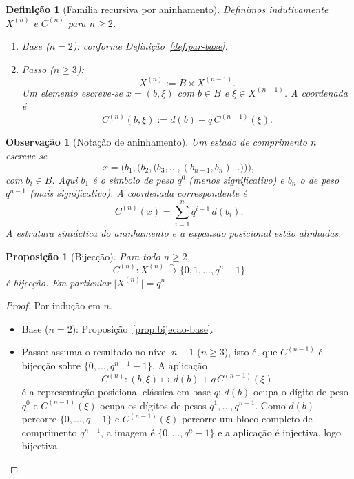 \documentclass[11pt,a4paper]{article}
\newtheorem{definicao}{Definição}
\newtheorem{proposicao}{Proposição}
\newtheorem{observacao}{Observação}
\begin{document}
\begin{definicao}[Família recursiva por aninhamento]
\label{def:familia}
Definimos indutivamente \(X^{(n)}\) e \(C^{(n)}\) para \(n\ge 2\).

\begin{enumerate}[leftmargin=1.5em]
\item Base (\(n=2\)): conforme Definição~\ref{def:par-base}.

\item Passo (\(n\ge 3\)):
\[
X^{(n)} := B\times X^{(n-1)}.
\]
Um elemento escreve-se \(x=(b,\xi)\) com \(b\in B\) e \(\xi\in X^{(n-1)}\).
A coordenada é
\[
C^{(n)}(b,\xi) := d(b) + q\, C^{(n-1)}(\xi).
\]
\end{enumerate}
\end{definicao}

\begin{observacao}[Notação de aninhamento]
\label{obs:aninhamento}
Um estado de comprimento \(n\) escreve-se
\[
x = \bigl(b_1,\bigl(b_2,\bigl(b_3,\dots,(b_{n-1},b_n)\dots\bigr)\bigr)\bigr),
\]
com \(b_i\in B\).
Aqui \(b_1\) é o símbolo de peso \(q^0\) (menos significativo) e \(b_n\) o de
peso \(q^{n-1}\) (mais significativo).
A coordenada correspondente é
\[
C^{(n)}(x) = \sum_{i=1}^{n} q^{i-1}\, d(b_i).
\]
A estrutura sintáctica do aninhamento e a expansão posicional estão alinhadas.
\end{observacao}

\begin{proposicao}[Bijecção]
\label{prop:bijecao}
Para todo \(n\ge 2\),
\[
C^{(n)}\colon X^{(n)}\overset{\sim}{\longrightarrow}\{0,1,\dots,q^n-1\}
\]
é bijecção.
Em particular \(\lvert X^{(n)}\rvert = q^n\).
\end{proposicao}

\begin{proof}
Por indução em \(n\).

\begin{itemize}[leftmargin=1.5em]
\item Base (\(n=2\)): Proposição~\ref{prop:bijecao-base}.

\item Passo: assuma o resultado no nível \(n-1\) (\(n\ge 3\)), isto é,
que \(C^{(n-1)}\) é bijecção sobre \(\{0,\dots,q^{n-1}-1\}\).
A aplicação
\[
C^{(n)}\colon(b,\xi)\mapsto d(b)+q\, C^{(n-1)}(\xi)
\]
é a representação posicional clássica em base \(q\): \(d(b)\) ocupa o dígito
de peso \(q^0\) e \(C^{(n-1)}(\xi)\) ocupa os dígitos de pesos
\(q^1,\dots,q^{n-1}\).
Como \(d(b)\) percorre \(\{0,\dots,q-1\}\) e \(C^{(n-1)}(\xi)\) percorre um
bloco completo de comprimento \(q^{n-1}\), a imagem é
\(\{0,\dots,q^{n}-1\}\) e a aplicação é injectiva, logo bijectiva.
\end{itemize}
\end{proof}
\end{document}
